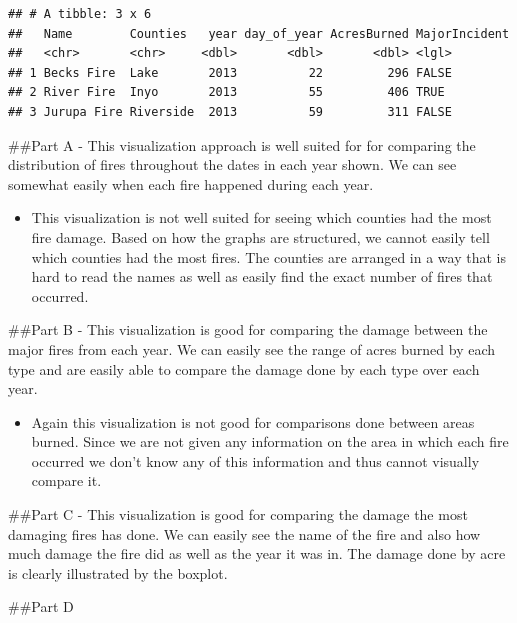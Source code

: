 \documentclass[
]{article}
\providecommand{\tightlist}{%
  \setlength{\itemsep}{0pt}\setlength{\parskip}{0pt}}
\begin{document}
\begin{verbatim}
## # A tibble: 3 x 6
##   Name        Counties   year day_of_year AcresBurned MajorIncident
##   <chr>       <chr>     <dbl>       <dbl>       <dbl> <lgl>        
## 1 Becks Fire  Lake       2013          22         296 FALSE        
## 2 River Fire  Inyo       2013          55         406 TRUE         
## 3 Jurupa Fire Riverside  2013          59         311 FALSE
\end{verbatim}

\#\#Part A - This visualization approach is well suited for for
comparing the distribution of fires throughout the dates in each year
shown. We can see somewhat easily when each fire happened during each
year.

\begin{itemize}
\tightlist
\item
  This visualization is not well suited for seeing which counties had
  the most fire damage. Based on how the graphs are structured, we
  cannot easily tell which counties had the most fires. The counties are
  arranged in a way that is hard to read the names as well as easily
  find the exact number of fires that occurred.
\end{itemize}

\#\#Part B - This visualization is good for comparing the damage between
the major fires from each year. We can easily see the range of acres
burned by each type and are easily able to compare the damage done by
each type over each year.

\begin{itemize}
\tightlist
\item
  Again this visualization is not good for comparisons done between
  areas burned. Since we are not given any information on the area in
  which each fire occurred we don't know any of this information and
  thus cannot visually compare it.
\end{itemize}

\#\#Part C - This visualization is good for comparing the damage the
most damaging fires has done. We can easily see the name of the fire and
also how much damage the fire did as well as the year it was in. The
damage done by acre is clearly illustrated by the boxplot.

\#\#Part D
\end{document}
